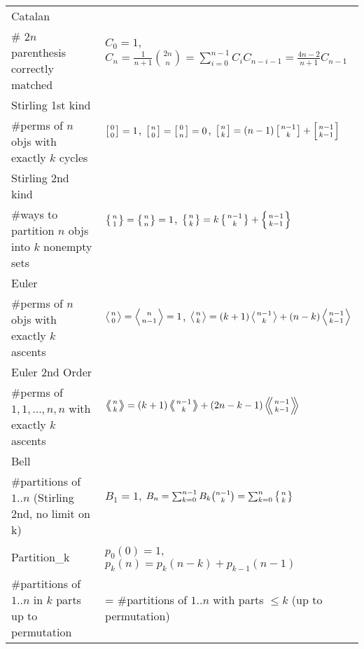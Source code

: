 \documentclass[landscape,a4paper,twocolumn,10pt]{report}
\begin{document}
\begin{center}
\begin{tabular}{@{}l|l@{}}
Catalan & \multirow{2}{*}{$C_0=1$, $C_n=\frac{1}{n+1}\binom{2n}{n} = \sum_{i=0}^{n-1}C_iC_{n-i-1} = \frac{4n-2}{n+1}C_{n-1}$} \\
\# $2n$ parenthesis correctly matched & \\
Stirling 1st kind & \multirow{2}{*}{$\left[{0\atop 0}\right]=1$, $\left[{n\atop 0}\right]=\left[{0\atop n}\right]=0$, $\left[{n\atop k}\right]=(n-1)\left[{n-1\atop k}\right]+\left[{n-1\atop k-1}\right]$} \\
\#perms of $n$ objs with exactly $k$ cycles & \\ %
Stirling 2nd kind & \multirow{2}{*}{$\left\{{n\atop 1}\right\}=\left\{{n\atop n}\right\}=1$, $\left\{{n\atop k}\right\} = k \left\{{ n-1 \atop k }\right\} + \left\{{n-1\atop k-1}\right\}$} \\
\#ways to partition $n$ objs into $k$ nonempty sets & \\ %
Euler & \multirow{2}{*}{$\left \langle {n\atop 0} \right \rangle = \left \langle {n\atop n-1} \right \rangle = 1 $, $\left \langle {n\atop k} \right \rangle = (k+1) \left \langle {n-1\atop {k}} \right \rangle + (n-k)\left \langle {{n-1}\atop {k-1}} \right \rangle$} \\
\#perms of $n$ objs with exactly $k$ ascents & \\ %
Euler 2nd Order & \multirow{2}{*}{$\left \langle \!\!\left \langle {n\atop k} \right \rangle \!\! \right \rangle = (k+1) \left \langle \!\! \left \langle {{n-1}\atop {k}} \right \rangle \!\! \right \rangle +(2n-k-1)\left \langle \!\! \left \langle {{n-1}\atop {k-1}} \right \rangle \!\! \right \rangle$} \\
\#perms of ${1,1,...,n,n}$ with exactly $k$ ascents & \\ %
Bell & \multirow{2}{*}{$B_1 = 1$, $B_n = \sum_{k=0}^{n-1} B_k \binom{n-1}{k} = \sum_{k=0}^n\left\{{n\atop k}\right\}$} \\
\#partitions of $1..n$ (Stirling 2nd, no limit on k) & \\
Partition\_k & $p_0(0) = 1$, $p_k(n) = p_k(n-k) + p_{k-1}(n-1)$ \\
\#partitions of $1..n$ in $k$ parts up to permutation & = \#partitions of $1..n$ with parts $\leq k$ (up to permutation)\\
\end{tabular}
\end{center}
\end{document}
